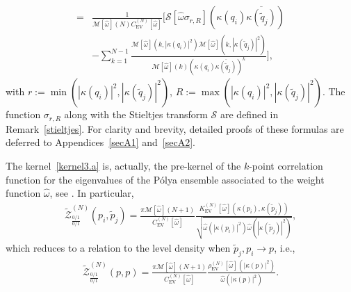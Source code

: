 \documentclass[pdflatex,sn-mathphys-num]{sn-jnl}
\theoremstyle{thmstyleone}
\numberwithin{equation}{section}
\begin{document}
\begin{align}
    \\
    =&\frac{1}{\mathcal{M}[\widehat{\omega}](N)C^{\left( N \right)}_{\mathrm{EV}}\left[ \widehat{\omega} \right]}\Bigg[\mathcal{S}[\widehat{\omega}\sigma_{r,R}]\left(\kappa(q_{i})\overline{\kappa(\widetilde{q}_{j})}\right)\\
    &-\sum_{k=1}^{N-1}\frac{\mathcal{M}[\widehat{\omega}](k,\left|\kappa(q_{i})\right|^{2})\mathcal{M}[\widehat{\omega}](k,\left|\kappa(\widetilde{q}_{j})\right|^{2})}{\mathcal{M}[\widehat{\omega}](k)(\kappa(q_{i})\overline{\kappa(\widetilde{q}_{j})})^{k}}\Bigg],\label{kernel3.c}
\end{align}
with $r:=\min(\left|\kappa(q_{i})\right|^{2},\left|\kappa(\widetilde{q}_{j})\right|^{2})$, $R:=\max(\left|\kappa(q_{i})\right|^{2},\left|\kappa(\widetilde{q}_{j})\right|^{2})$. The function $\sigma_{r,R}$ along with the Stieltjes transform $\mathcal{S}$ are defined in Remark~\ref{stieltjes}.
 For clarity and brevity, detailed proofs of these formulas are deferred to Appendices~\ref{secA1} and~\ref{secA2}.

The kernel~\eqref{kernel3.a} is, actually, the pre-kernel of the $k$-point correlation function for the eigenvalues of the P\'olya ensemble associated to the weight function $\widehat{\omega}$, see \cite[Lemma 4.1]{kieburgExactRelationSingular2016}. In particular,
    \begin{align}
        \widetilde{\mathscr{Z}}^{\left ( N \right )}_{\frac{0/1}{0/1}}\left ( p_{i},\widetilde{p}_{j} \right )=\frac{\pi\mathcal{M}[\widehat{\omega}](N+1)}{ C^{\left( N \right)}_{\mathrm{EV}}[\widehat{\omega}]}\frac{K^{\left( N \right)}_{\mathrm{EV}}\left[ \widehat{\omega} \right]\left( \kappa(p_i),\kappa(\widetilde{p}_j) \right)}{\sqrt{\widehat{\omega}\left( \left| \kappa(p_i) \right|^{2} \right)\widehat{\omega}\left( \left| \kappa(\widetilde{p}_j) \right|^{2} \right)}},
    \end{align}
which reduces to a relation to the level density when $\widetilde{p}_j,p_i\to p$, i.e.,
    \begin{align}
        \widetilde{\mathscr{Z}}^{\left ( N \right )}_{\frac{0/1}{0/1}}\left ( p,p \right )=\frac{\pi\mathcal{M}[\widehat{\omega}](N+1)}{ C^{\left( N \right)}_{\mathrm{EV}}[\widehat{\omega}]}\frac{\rho^{\left( N \right)}_{\mathrm{EV}}\left[ \widehat{\omega} \right]\left(  \left| \kappa\left( p \right) \right|^{2} \right)}{\widehat{\omega}\left( \left| \kappa\left( p \right) \right|^{2} \right)}.
    \end{align}
    
\end{document}
